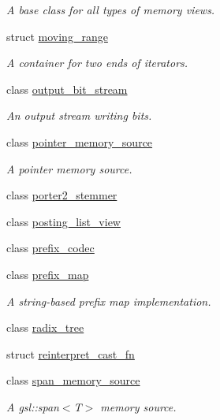 \begin{DoxyCompactItemize}
\begin{DoxyCompactList}\small\item\em A base class for all types of memory views. \end{DoxyCompactList}\item 
struct \mbox{\hyperlink{structirk_1_1moving__range}{moving\+\_\+range}}
\begin{DoxyCompactList}\small\item\em A container for two ends of iterators. \end{DoxyCompactList}\item 
class \mbox{\hyperlink{classirk_1_1output__bit__stream}{output\+\_\+bit\+\_\+stream}}
\begin{DoxyCompactList}\small\item\em An output stream writing bits. \end{DoxyCompactList}\item 
class \mbox{\hyperlink{classirk_1_1pointer__memory__source}{pointer\+\_\+memory\+\_\+source}}
\begin{DoxyCompactList}\small\item\em A pointer memory source. \end{DoxyCompactList}\item 
class \mbox{\hyperlink{classirk_1_1porter2__stemmer}{porter2\+\_\+stemmer}}
\item 
class \mbox{\hyperlink{classirk_1_1posting__list__view}{posting\+\_\+list\+\_\+view}}
\item 
class \mbox{\hyperlink{classirk_1_1prefix__codec}{prefix\+\_\+codec}}
\item 
class \mbox{\hyperlink{classirk_1_1prefix__map}{prefix\+\_\+map}}
\begin{DoxyCompactList}\small\item\em A string-\/based prefix map implementation. \end{DoxyCompactList}\item 
class \mbox{\hyperlink{classirk_1_1radix__tree}{radix\+\_\+tree}}
\item 
struct \mbox{\hyperlink{structirk_1_1reinterpret__cast__fn}{reinterpret\+\_\+cast\+\_\+fn}}
\item 
class \mbox{\hyperlink{classirk_1_1span__memory__source}{span\+\_\+memory\+\_\+source}}
\begin{DoxyCompactList}\small\item\em A gsl\+::span$<$\+T$>$ memory source. \end{DoxyCompactList}\item 

\end{DoxyCompactItemize}
